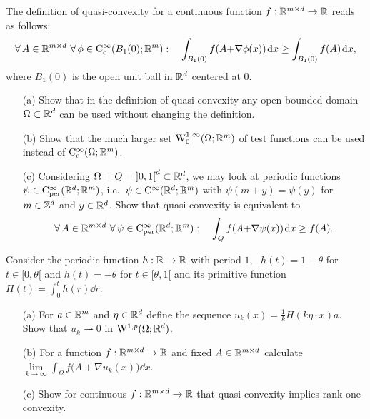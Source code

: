 \documentclass[12pt,a4paper]{article}
\begin{document}

\setcounter{AUFGABE}{36}



The definition of quasi-convexity for a continuous function
$f:{\mathbb R}^{m\times d} \to{\mathbb R}$ reads as follows:
\[
\forall\, A\in {\mathbb R}^{m\times d} \ \forall \, \phi\in {\mathrm C}^\infty_{\mathrm c}({B_1(0)};{\mathbb R}^m)
: \quad \int_{B_1(0)} f(A{+}\nabla \phi(x)) \;\!\mathrm{d} x \geq \int_{B_1(0)}
f(A) \;\!\mathrm{d} x ,
\]
where $B_1(0)$ is the open unit ball in ${\mathbb R}^d$ centered at $0$. 
\begin{itemize}
\item[(a)] Show that in the definition of quasi-convexity any open  bounded
domain $\Omega \subset {\mathbb R}^d$ can be used without changing the
definition. 
\item[(b)] Show that the much larger set
${\mathrm W}^{1,\infty}_0(\Omega;{\mathbb R}^m)$ of test functions can be used
instead of ${\mathrm C}^\infty_{\mathrm c}(\Omega;{\mathbb R}^m)$. 
\item[(c)] Considering $\Omega=Q={]0,1[}^d\subset {\mathbb R}^d$, we may look at periodic
functions $\psi\in {\mathrm C}^\infty_\text{per}({\mathbb R}^d;{\mathbb R}^m)$, i.e.\ $\psi\in
{\mathrm C}^\infty({\mathbb R}^d;{\mathbb R}^m)$ with $\psi(m{+}y)=\psi(y)$ 
for $m\in {\mathbb Z}^d$ and $y\in {\mathbb R}^d$. Show that quasi-convexity is
equivalent to 
\[
\forall\, A\in \R^{m\ti d} \ \forall \, \psi\in 
\rmC^\infty_\text{per}(\R^d;\R^m):\quad 
 \int_Q f(A{+}\nabla \psi(x)) \dd x \geq f(A).
\]
\end{itemize}



Consider the periodic function $h:{\mathbb R} \to {\mathbb R}$ with period $1$, \, 
$h(t)=1{-}\theta$ for $t\in {[0,\theta[}$ and $h(t)=-\theta$ for $t\in
{[\theta,1[}$ and its primitive function $H(t)=\int_0^t h(r) \dd
r$.%
\begin{itemize}
\item[(a)] For $a\in {\mathbb R}^m$ and $\eta\in {\mathbb R}^d$ define the sequence $u_k(x) =
\frac1k H(k \eta{\cdot} x)a$. Show that $u_k\rightharpoonup0$ in
${\mathrm W}^{1,p}(\Omega;{\mathbb R}^d)$.%
\item[(b)] For a function $f:{\mathbb R}^{m\times d}\to {\mathbb R}$ and fixed $A \in{\mathbb R}^{m\times d}$
calculate $\lim\limits_{k\to \infty}\int_\Omega f\big(A{+}\nabla u_k(x)\big)\dd
x$.%
\item[(c)] Show for continuous $f:{\mathbb R}^{m\times d} \to {\mathbb R}$ that quasi-convexity
implies rank-one convexity.  
\end{itemize}
\end{document}
